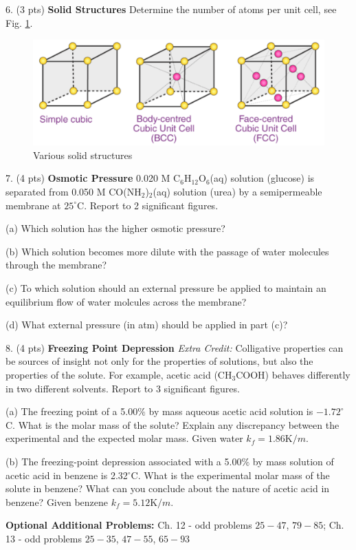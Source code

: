 \documentclass[11pt]{article}
\begin{document}
\vspace{2in}

6. (3 pts) \textbf{Solid Structures} Determine the number of atoms per unit cell,
see Fig. \ref{fig:cub}.

\begin{figure}[hbpt]
  \centering
  \includegraphics[scale=0.25]{cubic.png}
  \caption{Various solid structures}
  \label{fig:cub}
\end{figure}

\vspace{3in}

7. (4 pts) \textbf{Osmotic Pressure} 0.020 M C$_6$H$_{12}$O$_6$(aq)
solution (glucose) is separated from 0.050 M CO(NH$_2$)$_2$(aq) solution (urea) by a
semipermeable membrane at $25^\circ$C. Report to 2 significant figures.

(a) Which solution has the higher osmotic pressure?

(b) Which solution becomes more dilute with the passage of water molecules through the
membrane?

(c) To which solution should an external pressure be applied to maintain an equilibrium
flow of water molcules across the membrane?

(d) What external pressure (in atm) should be applied in part (c)?

\vspace{2in}

8. (4 pts) \textbf{Freezing Point Depression} \textit{Extra Credit:} Colligative properties
can be sources of insight not only for the properties of solutions, but also the properties
of the solute. For example, acetic acid (CH$_3$COOH) behaves differently in two different
solvents. Report to 3 significant figures.

(a) The freezing point of a 5.00$\%$ by mass aqueous acetic acid solution is $-1.72^\circ$C.
What is the molar mass of the solute? Explain any discrepancy between the experimental and
the expected molar mass. Given water $k_f = 1.86 \text{K}/m$.

(b) The freezing-point depression associated with a 5.00$\%$ by mass solution of acetic
acid in benzene is 2.32$^\circ$C. What is the experimental molar mass of the solute in
benzene? What can you conclude about the nature of acetic acid in benzene? Given
benzene $k_f = 5.12 \text{K}/m$.


\vfill
\textbf{Optional Additional Problems:} Ch. 12 - odd problems $25 - 47$, $79 - 85$;
Ch. 13 - odd problems $25 - 35$, $47 - 55$, $65 - 93$
\end{document}
